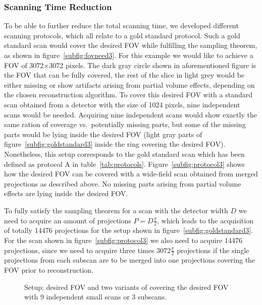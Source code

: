 \subsubsection{Scanning Time Reduction}
To be able to further reduce the total scanning time, we developed different scanning protocols, which all relate to a gold standard protocol. Such a gold standard scan would cover the desired FOV while fulfilling the sampling theorem, as shown in figure~\ref{subfig:fovneed3}. For this example we would like to achieve a FOV of 3072$\times$3072 pixels. The dark gray circle shown in aforementioned figure is the FOV that can be fully covered, the rest of the slice in light grey would be either missing or show artifacts arising from partial volume effects, depending on the chosen reconstruction algorithm. To cover this desired FOV with a standard scan obtained from a detector with the size of 1024 pixels, nine independent scans would be needed. Acquiring nine independent scans would show exactly the same ration of coverage vs.\ potentially missing parts, but some of the missing parts would be lying inside the desired FOV (light gray parts of figure~\ref{subfig:goldstandard3} inside the ring covering the desired FOV). Nonetheless, this setup corresponds to the gold standard scan which has been defined as protocol A in table~\ref{tab:protocols}. Figure~\ref{subfig:protocol3} shows how the desired FOV can be covered with a wide-field scan obtained from merged projections as described above. No missing parts arising from partial volume effects are lying inside the desired FOV.

To fully satisfy the sampling theorem for a scan with the detector width $D$ we need to acquire an amount of projections $P=D\frac{\pi}{2}$, which leads to the acquisition of totally 14476 projections for the setup shown in figure~\ref{subfig:goldstandard3}. For the scan shown in figure~\ref{subfig:protocol3} we also need to acquire 14476 projections, since we need to acquire three times $3072\frac{\pi}{2}$ projections if the single projections from each subscan are to be merged into one projections covering the FOV prior to reconstruction.
\cbend

\cbstart
\begin{figure*}[htp]
	\centering%
	\caption[Setup for 3 SubScans]{Setup; desired FOV and two variants of covering the desired FOV with 9 independent small scans or 3 subscans.}%
	\label{fig:Setup3SubScans}%
\end{figure*}

